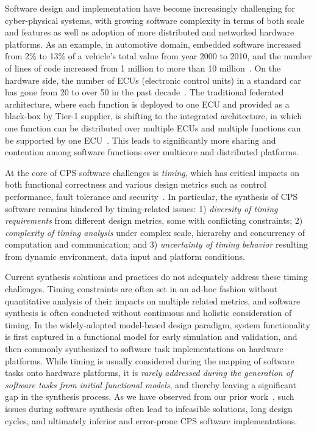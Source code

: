 
\setcounter{section}{0}
\setcounter{figure}{0}
\graphicspath{{./figs/}{./figs/item-qi/}}


Software design and implementation have become increasingly challenging for cyber-physical systems, with growing software complexity in terms of both scale and features as well as adoption of more distributed and networked hardware platforms. As an example, in automotive domain, embedded software increased from 2\% to 13\% of a vehicle's total value from year 2000 to 2010, and the number of lines of code increased from 1 million to more than 10 million~\cite{QuoVadis, IEEESpectrumAuto}. On the hardware side, the number of ECUs (electronic control units) in a standard car has gone from 20 to over 50 in the past decade~\cite{IEEESpectrumAuto}. The traditional federated architecture, where each function is deployed to one ECU and provided as a black-box by Tier-1 supplier, is shifting to the integrated architecture, in which one function can be distributed over multiple ECUs and multiple functions can be supported by one ECU~\cite{DiNatale_IEEE10}. This leads to significantly more sharing and contention among software functions over multicore and distributed platforms.

At the core of CPS software challenges is \emph{timing}, which has critical impacts on both functional correctness and various design metrics such as control performance, fault tolerance and security~\cite{edward_11, ASV07Automotive, mueller_hcsp06}. In particular, the synthesis of CPS software remains hindered by timing-related issues: 1) \emph{diversity of timing requirements} from different design metrics, some with conflicting constraints; 2) \emph{complexity of timing analysis} under complex scale, hierarchy and concurrency of computation and communication; and 3) \emph{uncertainty of timing behavior} resulting from dynamic environment, data input and platform conditions. 

Current synthesis solutions and practices do not adequately address these timing challenges. Timing constraints are often set in an ad-hoc fashion without quantitative analysis of their impacts on multiple related metrics, and software synthesis is often conducted without continuous and holistic consideration of timing. In the widely-adopted model-based design paradigm, system functionality is first captured in a functional model for early simulation and validation, and then commonly synthesized to software task implementations on hardware platforms. While timing is usually considered during the mapping of software tasks onto hardware platforms, it is \emph{rarely addressed during the generation of software tasks from initial functional models}, and thereby leaving a significant gap in the synthesis process.  As we have observed from our prior work~\cite{Zheng_TCAD16, Deng_ICCPS15, Deng_SIES14, Zhu_DATE13, Guo_CODES14, Deng_TC16}, such issues during software synthesis often lead to infeasible solutions, long design cycles, and ultimately inferior and error-prone CPS software implementations.

